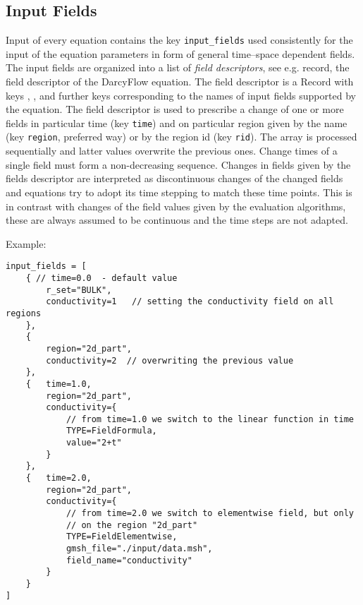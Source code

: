 \subsection{Input Fields}
Input of every equation contains the key \verb'input_fields' used consistently for the input of the equation parameters 
in form of general time--space dependent fields.  The input fields are organized into a list of {\it field descriptors}, see 
e.g.  record, the field descriptor of the DarcyFlow equation.
The field descriptor is a Record with keys 
, 
, 
and further keys corresponding to the 
names of input fields supported by the equation. The field descriptor is used to prescribe
a change of one or more fields in particular time (key \verb'time') and on particular region given  by the name (key \verb'region', preferred way) 
or by the region id (key \verb'rid'). 
The array is processed sequentially and latter values overwrite the previous ones. Change times of a single field must form a non-decreasing sequence.
Changes in fields given by the fields descriptor are interpreted as discontinuous changes of the changed fields
and equations try to adopt its time stepping to match these time points. This is in contrast with changes of the field values given by
the evaluation algorithms, these are always assumed to be continuous and the time steps are not adapted. 



Example:
\begin{verbatim}
input_fields = [   
    { // time=0.0  - default value
        r_set="BULK",
        conductivity=1   // setting the conductivity field on all regions
    },
    {
        region="2d_part",
        conductivity=2  // overwriting the previous value
    },
    {   time=1.0,
        region="2d_part",
        conductivity={
            // from time=1.0 we switch to the linear function in time
            TYPE=FieldFormula,
            value="2+t"      
        }    
    },
    {   time=2.0,
        region="2d_part",
        conductivity={
            // from time=2.0 we switch to elementwise field, but only
            // on the region "2d_part"
            TYPE=FieldElementwise,
            gmsh_file="./input/data.msh",
            field_name="conductivity"
        }
    }    
]               
\end{verbatim}



